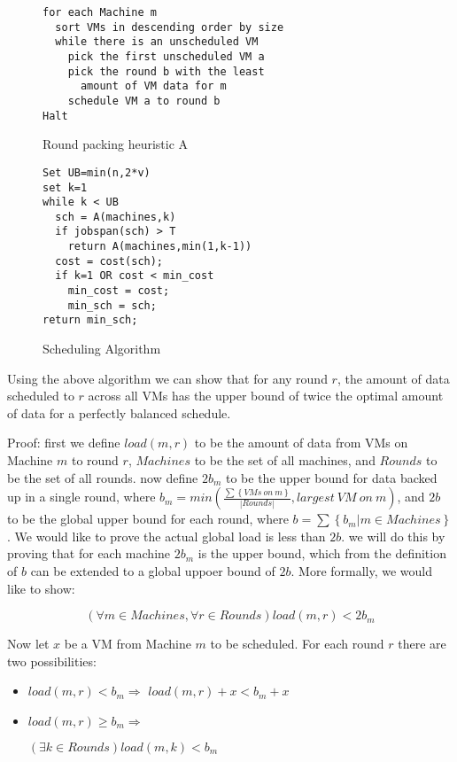 \begin{figure}
\begin{lstlisting}[frame=single]
for each Machine m
  sort VMs in descending order by size
  while there is an unscheduled VM
    pick the first unscheduled VM a
    pick the round b with the least
      amount of VM data for m
    schedule VM a to round b
Halt
\end{lstlisting}
\caption{Round packing heuristic A}
\label{fig-bpl}
\end{figure}

\begin{figure}
\begin{lstlisting}[frame=single]
Set UB=min(n,2*v)
set k=1
while k < UB
  sch = A(machines,k)
  if jobspan(sch) > T
    return A(machines,min(1,k-1))
  cost = cost(sch);
  if k=1 OR cost < min_cost
    min_cost = cost;
    min_sch = sch;
return min_sch;
\end{lstlisting}
\caption{Scheduling Algorithm}
\label{fig-scheduler}
\end{figure}

Using the above algorithm we can show that for any round $r$, the amount of
data scheduled to $r$ across all VMs has the upper bound of twice the optimal
amount of data for a perfectly balanced schedule.

Proof:
first we define $load(m,r)$ to be the amount of data from VMs on Machine $m$
to round $r$, $Machines$ to be the set of all machines, and $Rounds$ to be
the set of all rounds.
now define $2b_m$ to be the upper bound for data backed up in a single round, 
where 
$b_m = min(\frac{\sum \left\{ {VMs~on~m} \right\}}{\left\vert {Rounds} \right\vert}, largest~VM~on~m)$,
and $2b$ to be the global upper bound for each round, where
$b = \sum \left\{ b_m | m \in Machines \right\}$. We would like to prove the
actual global load is less than $2b$. we will do this by proving that for
each machine $2b_m$ is the upper bound, which from the definition of $b$ can be
extended to a global uppoer bound of $2b$. More formally, we would like to show:

\[
    (\forall m \in Machines, \forall r \in Rounds) load(m,r) < 2b_m
\]

Now let $x$ be a VM from Machine $m$ to be scheduled.
For each round $r$ there are two possibilities:
\begin{itemize}
    \item $load(m,r) < b_m \Longrightarrow$
        $load(m,r)+x < b_m+x$
    \item $load(m,r) \ge b_m \Longrightarrow$

        $(\exists k \in Rounds) load(m,k) < b_m$
\end{itemize}


